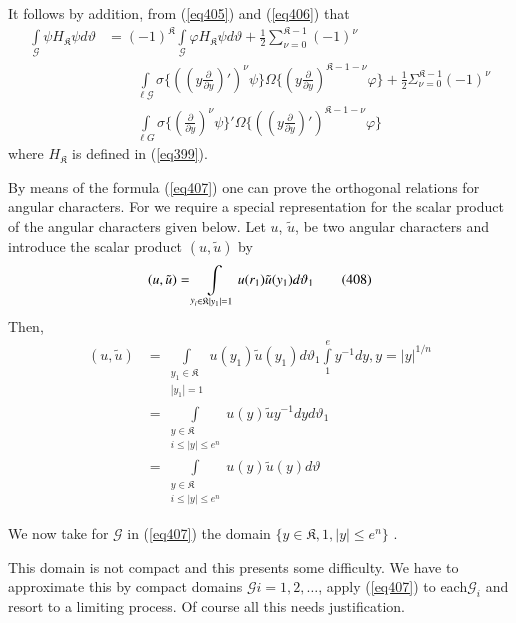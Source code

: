 It follows by addition, from (\ref{eq405}) and (\ref{eq406}) that 
\begin{align*}
\int\limits_{\mathscr{G}} \psi H_\mathfrak{K} \psi d \vartheta  & =
(-1)^\mathfrak{K} \int\limits_{ \mathscr{G}} \varphi H_\mathfrak{K} \psi
d \vartheta +\frac{1}{2} \sum_{\nu = 0}^{ \mathfrak{K} - 1}(-1)^\nu\\
& \qquad \int\limits_{\ell \mathscr{G}} \sigma \bigg\{ (( y \frac{\partial
}{\partial y})' )^\nu \psi \bigg\} \Omega \bigg\{
(y\frac{\partial}{\partial y})^{ \mathfrak{K}- 1 - \nu } \varphi
\bigg\}  + \frac{1}{2} \Sigma^{\mathfrak{K}-1}_{ \nu = 0}(-1)^\nu\\
& \qquad 
\int\limits_{\ell G} \sigma \bigg\{ (\frac{\partial}{\partial y})^\nu
\psi \bigg\}' \Omega \bigg\{ (( y \frac{\partial }{\partial y})' )^{
  \mathfrak{K} - 1- \nu }\varphi \bigg\} \tag{407}\label{eq407} 
\end{align*}\pageoriginale
where $H_{\mathfrak{K}}$ is defined in (\ref{eq399}).

By means of the formula (\ref{eq407}) one can prove the orthogonal relations
for angular characters. For we require a special representation for
the scalar product of the angular characters given below. Let $u$,
$\tilde{u}$, be two angular characters and introduce the scalar product
$(u, \tilde{u})$  by  
\begin{equation*}
(u , \tilde{u}) = \int\limits_{\substack y_i \in \mathfrak{K}\\  |y_1|
    = 1} u(r_1) \tilde{u}(y_1) d\vartheta_1 \tag{408}\label{eq408} 
\end{equation*}
Then, 
\begin{align*}
(u , \tilde{u})  & = \int\limits_{\substack{ y_1 \in \mathfrak{K} \\ |
      y_1 | = 1 }} u (y_1) \tilde{u} (y_1) d \vartheta_1 \int\limits^e
  _1 y^{ -1} dy, y = |y|^{ 1/n} \\ 
& = \int\limits_{\substack {y \in \mathfrak{K} \\ i \leq |y| \leq e^n}}
  u (y) \tilde {u}y^{-1} dy d\vartheta_1\\ 
& = \int\limits_{\substack {y \in \mathfrak{K} \\ i \leq |y| \leq e^n}}
  u (y) \tilde {u }(y)  d\vartheta
\end{align*}

We now take for $\mathscr{G}$ in (\ref{eq407}) the domain $\{ y \in
\mathfrak{K} , 1, |y| \leq e^n \}$ .  

This domain is not compact and this presents some difficulty. We have
to approximate this by compact domains $\mathscr{G} i = 1 , 2 ,
\ldots$, apply (\ref{eq407}) to each\pageoriginale $\mathscr{G}_i$ and
resort to a limiting process. Of course all this needs justification.   

